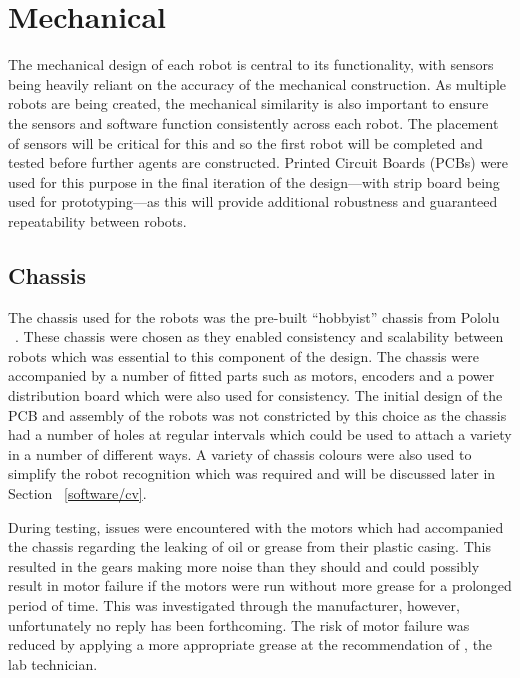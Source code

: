 
\chapter{Mechanical}\label{mechanical}

The mechanical design of each robot is central to its functionality, with sensors being heavily 
reliant on the accuracy of the mechanical construction. As multiple robots are being created, 
the mechanical similarity is also important to ensure the sensors and software function consistently across each robot. The placement of sensors will be critical for this and
so the first robot will be completed and tested before further agents are constructed.
Printed Circuit Boards (PCBs) were used for this purpose in the
final iteration of the design---with strip board being used for prototyping---as this will provide additional robustness and guaranteed repeatability between robots.

\section{Chassis}\label{mech/chassis}
The chassis used for the robots was the pre-built ``hobbyist'' chassis from Pololu ~\cite{pololuchassis}. These chassis were chosen as they enabled consistency and scalability between robots which was essential to this component of the design. The chassis were accompanied by a number of fitted parts such as motors, encoders and a power distribution board which were also used for consistency. The initial design of the PCB and assembly of the robots was not constricted by this choice as the chassis had a number of holes at regular intervals which could be used to attach a variety in a number of different ways. A variety of chassis colours were also used to simplify the robot recognition which was required and will be discussed later in Section ~\ref{software/cv}. 

During testing, issues were encountered with the motors which had accompanied the chassis regarding the leaking of oil or grease from their plastic casing. This resulted in the gears making more noise than they should and could possibly result in motor failure if the motors were run without more grease for a prolonged period of time. This was investigated through the manufacturer, however, unfortunately no reply has been forthcoming. The risk of motor failure was reduced by applying a more appropriate grease at the recommendation of , the lab technician.  

